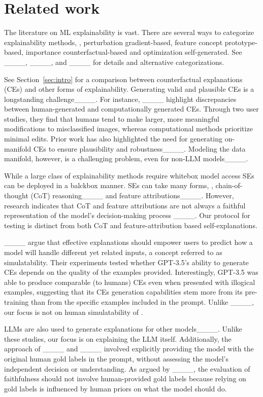 \section{Related work}
The literature on ML explainability is vast. There are several ways to categorize explainability methods, \eg, perturbation \vs gradient-based, feature \vs concept \vs prototype-based, importance \vs counterfactual-based and optimization \vs self-generated.
See ____, ____, and ____ for details and alternative categorizations. 



See Section~\ref{sec:intro} for a comparison between counterfactual explanations (CEs) and other forms of explainability.
Generating valid and plausible CEs is a longstanding challenge____.
For instance, ____ highlight discrepancies between human-generated and computationally generated CEs. Through two user studies, they find that humans tend to make larger, more meaningful modifications to misclassified images, whereas computational methods prioritize minimal edits.
Prior work has also highlighted the need for generating on-manifold CEs to ensure plausibility and robustness____. Modeling the data manifold, however, is a challenging problem, even for non-LLM models____.





While a large class of explainability methods require whitebox model access SEs can be deployed in a balckbox manner.
SEs can take many forms, \eg, chain-of-thought (CoT) reasoning____ and feature attributions____.
However, research indicates that CoT and feature attributions are not always a faithful representation of the model's decision-making process ____.
Our protocol for testing \SCEs is distinct from both CoT and feature-attribution based self-explanations.

____ argue that effective explanations should empower users to predict how a model will handle different yet related inputs, a concept referred to as simulatability. 
Their experiments tested whether GPT-3.5's ability to generate CEs depends on the quality of the examples provided. Interestingly, GPT-3.5 was able to produce comparable (to humans) CEs even when presented with illogical examples, suggesting that its CEs generation capabilities stem more from its pre-training than from the specific examples included in the prompt.
Unlike ____, our focus is not on human simulatability of \SCEs.


LLMs are also used to generate explanations for other  models____. Unlike these studies, our focus is on explaining the LLM itself.
Additionally, the approach of ____ and ____ involved explicitly providing the model with the original human gold labels in the prompt, without assessing the model's independent decision or understanding. As argued by ____, the evaluation of faithfulness should not involve human-provided gold labels because relying on gold labels is influenced by human priors on what the model should do.